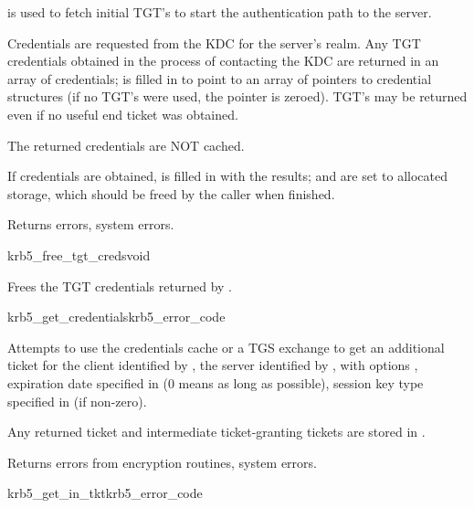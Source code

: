  is used to fetch initial TGT's to start the authentication
path to the server.

Credentials are requested from the KDC for the server's realm.  Any
TGT credentials obtained in the process of contacting the KDC are
returned in an array of credentials;  is filled in to
point to an array of pointers to credential structures (if no TGT's were
used, the pointer is zeroed).  TGT's may be returned even if no useful
end ticket was obtained.

The returned credentials are NOT cached.

If credentials are obtained,  is filled in with the results;
 and
 are set to allocated storage,
which should be freed by the caller when finished.

Returns errors, system errors.


\begin{funcdecl}{krb5_free_tgt_creds}{void}{\funcin}
\end{funcdecl}

Frees the TGT credentials  returned by
.

\begin{funcdecl}{krb5_get_credentials}{krb5_error_code}{\funcin}
\funcinout
{}
\end{funcdecl}

Attempts to use the credentials cache  or a TGS
exchange to get an additional ticket for the client identified by
, the server identified by
, with options ,
expiration date specified in  (0
means as long as possible), session key type specified in
 (if non-zero).

Any returned ticket and intermediate ticket-granting tickets are
stored in .

Returns errors from encryption routines, system errors.

\begin{funcdecl}{krb5_get_in_tkt}{krb5_error_code}{\funcin}
\funcendfuncarg
{}
\funcendfuncarg
{}
\funcinout
{}
\end{funcdecl}


